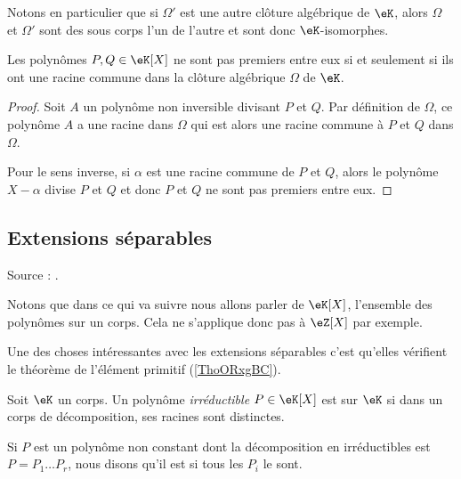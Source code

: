 Notons en particulier que si \( \Omega'\) est une autre clôture algébrique de \( \eK\), alors \( \Omega\) et \( \Omega'\) sont des sous corps l'un de l'autre et sont donc \( \eK\)-isomorphes.

\begin{lemma}
    Les polynômes \( P,Q\in \eK[X]\) ne sont pas premiers entre eux si et seulement si ils ont une racine commune dans la clôture algébrique \( \Omega\) de \( \eK\).
\end{lemma}

\begin{proof}
    Soit \( A\) un polynôme non inversible divisant \( P\) et $Q$. Par définition de \( \Omega\), ce polynôme \( A\) a une racine dans \( \Omega\) qui est alors une racine commune à \( P\) et \( Q\) dans \( \Omega\).

    Pour le sens inverse, si \( \alpha\) est une racine commune de \( P\) et \( Q\), alors le polynôme \( X-\alpha\) divise \( P\) et \( Q\) et donc \( P\) et \( Q \) ne sont pas premiers entre eux.
\end{proof}


\subsection{Extensions séparables}

Source : \cite{vgQYwF}.

Notons que dans ce qui va suivre nous allons parler de \( \eK[X]\), l'ensemble des polynômes sur un corps. Cela ne s'applique donc pas à \( \eZ[X]\) par exemple.

Une des choses intéressantes avec les extensions séparables c'est qu'elles vérifient le théorème de l'élément primitif (\ref{ThoORxgBC}).

\begin{definition}
    Soit \( \eK\) un corps. Un polynôme \emph{irréductible} \( P\in \eK[X]\) est  sur $\eK$ si dans un corps de décomposition, ses racines sont distinctes.

    Si \( P\) est un polynôme non constant dont la décomposition en irréductibles est \( P=P_1\ldots P_r\), nous disons qu'il est  si tous les \( P_i\) le sont.
\end{definition}

